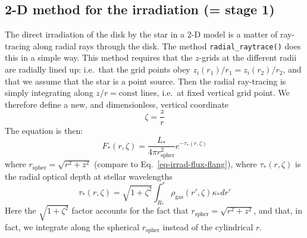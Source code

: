 \documentclass{book}
\newcommand{\code}[1]{{\small\tt #1}}
\begin{document}
\subsection{2-D method for the irradiation (= stage 1)}
\label{sec-2d-irrad}
The direct irradiation of the disk by the star in a 2-D model is a matter of
ray-tracing along radial rays through the disk. The method
\code{radial\_raytrace()} does this in a simple way. This method requires that
the $z$-grids at the different radii are radially lined up: i.e.\ that the grid
points obey $z_i(r_1)/r_1=z_i(r_2)/r_2$, and that we assume that the star is a
point source.  Then the radial ray-tracing is simply integrating along
$z/r=\mathrm{const}$ lines, i.e.~at fixed vertical grid point. We therefore
define a new, and dimensionless, vertical coordinate
\begin{equation}
  \zeta = \frac{z}{r}
\end{equation}
The equation is then:
\begin{equation}
F_{*}(r,\zeta) = \frac{L_{*}}{4\pi r_{\mathrm{spher}}^2} e^{-\tau_{*}(r,\zeta)}
\end{equation}
where $r_{\mathrm{spher}}=\sqrt{r^2+z^2}$
(compare to Eq.~\ref{eq-irrad-flux-flang}), where $\tau_{*}(r,\zeta)$ is the
radial optical depth at stellar wavelengths
\begin{equation}
\tau_{*}(r,\zeta) = \sqrt{1+\zeta^2}\int_{R_{*}}^r \rho_{\mathrm{gas}}(r',\zeta)\kappa_{*} dr'
\end{equation}
Here the $\sqrt{1+\zeta^2}$ factor accounts for the fact that
$r_{\mathrm{spher}}=\sqrt{r^2+z^2}$, and that, in fact, we integrate along the spherical
$r_{\mathrm{spher}}$ instead of the cylindrical $r$.
\end{document}
